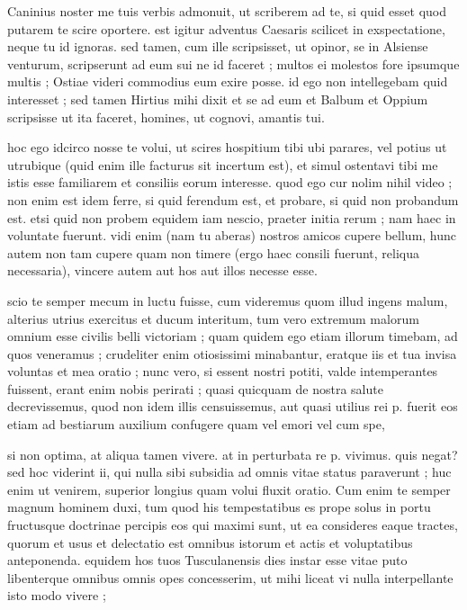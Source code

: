 


 Caninius noster me tuis verbis admonuit, ut scriberem ad te, si quid esset quod putarem te scire oportere. est igitur adventus Caesaris scilicet in exspectatione, neque tu id ignoras. sed tamen, cum ille scripsisset, ut opinor, se in Alsiense venturum, scripserunt ad eum sui ne id faceret ; multos ei molestos fore ipsumque multis ; Ostiae videri commodius eum exire posse. id ego non intellegebam quid interesset ; sed tamen Hirtius mihi dixit et se ad eum et Balbum et Oppium scripsisse ut ita faceret, homines, ut cognovi, amantis tui.

 hoc ego idcirco nosse te volui, ut scires hospitium tibi ubi parares, vel potius ut utrubique (quid enim ille facturus sit incertum est), et simul ostentavi tibi me istis esse familiarem et consiliis eorum interesse. quod ego cur nolim nihil video ; non enim est idem ferre, si quid ferendum est, et probare, si quid non probandum est. etsi quid non probem equidem iam nescio, praeter initia rerum ; nam haec in voluntate fuerunt. vidi enim (nam tu aberas) nostros amicos cupere bellum, hunc autem non tam cupere quam non timere (ergo haec consili fuerunt, reliqua necessaria), vincere autem aut hos aut illos necesse esse.

 scio te semper mecum in luctu fuisse, cum videremus quom illud ingens malum, alterius utrius exercitus et ducum interitum, tum vero extremum malorum omnium esse civilis belli victoriam ; quam quidem ego etiam illorum timebam, ad quos veneramus ; crudeliter enim otiosissimi minabantur, eratque iis et tua invisa voluntas et mea oratio ; nunc vero, si essent nostri potiti, valde intemperantes fuissent, erant enim nobis perirati ; quasi quicquam de nostra salute decrevissemus, quod non idem illis censuissemus, aut quasi utilius rei p. fuerit eos etiam ad bestiarum auxilium confugere quam vel emori vel cum spe,

 si non optima, at aliqua tamen vivere. at in perturbata re p. vivimus. quis negat? sed hoc viderint ii, qui nulla sibi subsidia ad omnis vitae status paraverunt ; huc enim ut venirem, superior longius quam volui fluxit oratio. Cum enim te semper magnum hominem duxi, tum quod his tempestatibus es prope solus in portu fructusque doctrinae percipis eos qui maximi sunt, ut ea consideres eaque tractes, quorum et usus et delectatio est omnibus istorum et actis et voluptatibus anteponenda. equidem hos tuos Tusculanensis dies instar esse vitae puto libenterque omnibus omnis opes concesserim, ut mihi liceat vi nulla interpellante isto modo vivere ;

